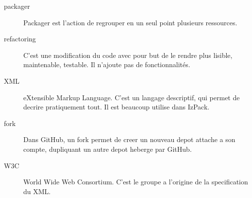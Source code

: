 \begin{description}
	\item[packager] Packager est l'action de regrouper en un seul point plusieurs ressources.
	\item[refactoring] C'est une modification du code avec pour but de le rendre plus lisible, maintenable, testable. Il n'ajoute pas de fonctionnalités.
	\item[XML] eXtensible Markup Language. C'est un langage descriptif, qui permet de decrire pratiquement tout. Il est beaucoup utilise dans IzPack.
	\item[fork] Dans GitHub, un fork permet de creer un nouveau depot attache a son compte, dupliquant un autre depot heberge par GitHub.
	\item[W3C] World Wide Web Consortium. C'est le groupe a l'origine de la specification du XML.
\end{description}
